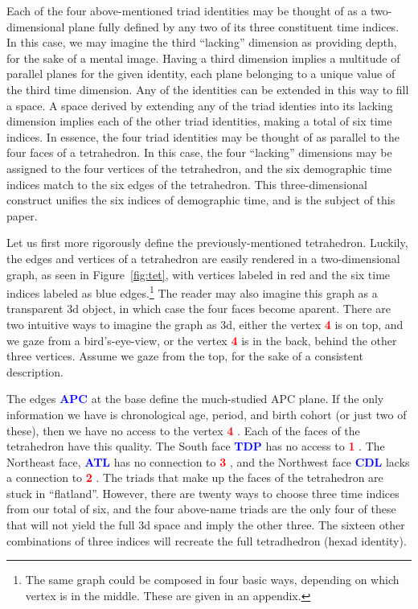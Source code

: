 \documentclass[11pt,oneside]{article} %
\newcommand\vt[1]{%
 \textcolor{red}{\textbf{#1}\hspace{-.3em}}
}
\newcommand\eg[1]{%
 \textcolor{blue}{\textbf{#1}\hspace{-.3em}}
}
\begin{document}
Each of the four above-mentioned triad identities may be thought of as a
two-dimensional plane fully defined by any two of its three constituent time
indices.
In this case, we may imagine the third ``lacking'' dimension as providing
depth, for the sake of a mental image.
Having a third dimension implies a multitude of parallel planes for the given identity, each plane
belonging to a unique value of the third time dimension. Any of the
identities can be extended in this way to fill a space. A space derived by
extending any of the triad identies into its lacking dimension implies each of the
other triad identities, making a total of six time indices. In essence, the
four triad identities may be thought of as parallel to the four faces of a
tetrahedron. In this case, the four ``lacking'' dimensions may be assigned to
the four vertices of the tetrahedron, and the six demographic time indices match
to the six edges of the tetrahedron. This three-dimensional construct
unifies the six indices of demographic time, and is the subject of this paper.

Let us first more rigorously define the previously-mentioned tetrahedron.
Luckily, the edges and vertices of a tetrahedron are easily rendered in a
two-dimensional graph, as seen in Figure~\ref{fig:tet}, with vertices labeled
in red and the six time indices labeled as blue edges.\footnote{The same graph
could be composed in four basic ways, depending on which vertex is in the
middle. These are given in an appendix.} The reader may also imagine this graph
as a transparent 3d object, in which case the four faces become aparent. There are two intuitive ways to imagine the graph as 3d, either the vertex \vt{4} is on top, and we gaze from a bird's-eye-view, or the
vertex \vt{4} is in the back, behind the other three vertices. Assume we
gaze from the top, for the sake of a consistent description. 

The edges \eg{APC} at the base define the much-studied APC plane. If the only
information we have is chronological age, period, and birth cohort (or just two
of these), then we have no access to the vertex \vt{4}. Each of the faces of the
tetrahedron have this quality. The South face \eg{TDP} has no access to \vt{1}.
The Northeast face, \eg{ATL} has no connection to \vt{3}, and the Northwest face
\eg{CDL} lacks a connection to \vt{2}. The triads that make up the faces of
the tetrahedron are stuck in ``flatland''. However, there are twenty ways to
choose three time indices from our total of six, and the four above-name triads
are the only four of these that will not yield the full 3d space and imply the other three. The sixteen other combinations of three indices will recreate the full
tetradhedron (hexad identity).
\end{document}
